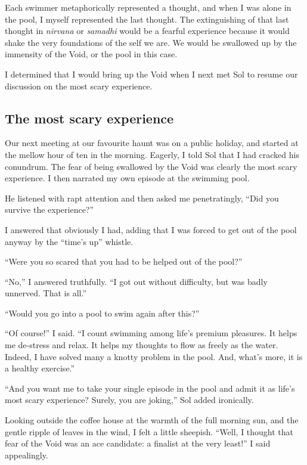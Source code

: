 \documentclass[
  a4paper,
]{article}
\begin{document}
Each swimmer metaphorically represented a thought, and when I was alone
in the pool, I myself represented the last thought. The extinguishing of
that last thought in \emph{nirvana} or \emph{samadhi} would be a fearful
experience because it would shake the very foundations of the self we
are. We would be swallowed up by the immensity of the Void, or the pool
in this case.

I determined that I would bring up the Void when I next met Sol to
resume our discussion on the most scary experience.

\subsection{The most scary experience}\label{the-most-scary-experience}

Our next meeting at our favourite haunt was on a public holiday, and
started at the mellow hour of ten in the morning. Eagerly, I told Sol
that I had cracked his conundrum. The fear of being swallowed by the
Void was clearly the most scary experience. I then narrated my own
episode at the swimming pool.

He listened with rapt attention and then asked me penetratingly, ``Did
you survive the experience?''

I answered that obviously I had, adding that I was forced to get out of
the pool anyway by the ``time's up'' whistle.

``Were you so scared that you had to be helped out of the pool?''

``No,'' I answered truthfully. ``I got out without difficulty, but was
badly unnerved. That is all.''

``Would you go into a pool to swim again after this?''

``Of course!'' I said. ``I count swimming among life's premium
pleasures. It helps me de-stress and relax. It helps my thoughts to flow
as freely as the water. Indeed, I have solved many a knotty problem in
the pool. And, what's more, it is a healthy exercise.''

``And you want me to take your single episode in the pool and admit it
as life's most scary experience? Surely, you are joking,'' Sol added
ironically.

Looking outside the coffee house at the warmth of the full morning sun,
and the gentle ripple of leaves in the wind, I felt a little sheepish.
``Well, I thought that fear of the Void was an ace candidate: a finalist
at the very least!'' I said appealingly.
\end{document}
